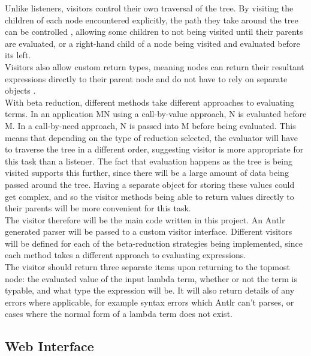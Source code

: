 \documentclass[a4paper,12pt]{report}
\begin{document}
Unlike listeners, visitors control their own traversal of the tree. By visiting the children of each node encountered explicitly, the path they take around the tree can be controlled \cite{Parr2012}, allowing some children to not being visited until their parents are evaluated, or a right-hand child of a node being visited and evaluated before its left.\\

Visitors also allow custom return types, meaning nodes can return their resultant expressions directly to their parent node and do not have to rely on separate objects \cite{Srivastav2017}.\\

With beta reduction, different methods take different approaches to evaluating terms. In an application MN using a call-by-value approach, N is evaluated before M. In a call-by-need approach, N is passed into M before being evaluated. This means that depending on the type of reduction selected, the evaluator will have to traverse the tree in a different order, suggesting visitor is more appropriate for this task than a listener. The fact that evaluation happens as the tree is being visited supports this further, since there will be a large amount of data being passed around the tree. Having a separate object for storing these values could get complex, and so the visitor methods being able to return values directly to their parents will be more convenient for this task.\\

The visitor therefore will be the main code written in this project. An Antlr generated parser will be passed to a custom visitor interface. Different visitors will be defined for each of the beta-reduction strategies being implemented, since each method takes a different approach to evaluating expressions.\\

The visitor should return three separate items upon returning to the topmost node: the evaluated value of the input lambda term, whether or not the term is typable, and what type the expression will be. It will also return details of any errors where applicable, for example syntax errors which Antlr can't parses, or cases where the normal form of a lambda term does not exist.

\subsection{Web Interface}
\end{document}
